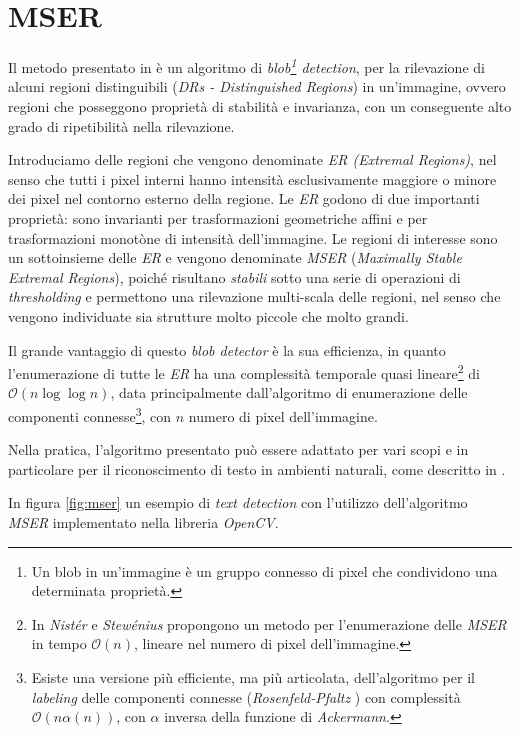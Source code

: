 \section{MSER}
Il metodo presentato in \cite{bib:mser} \`e un algoritmo di \textit{blob\footnote{Un blob in un'immagine \`e un gruppo connesso di pixel che condividono una determinata propriet\`a.} detection}, per la rilevazione di alcuni regioni distinguibili (\textit{DRs - Distinguished Regions}) in un'immagine, ovvero regioni che posseggono propriet\`a di stabilit\`a e invarianza, con un conseguente alto grado di ripetibilit\`a nella rilevazione.\par
Introduciamo delle regioni che vengono denominate \textit{ER (Extremal Regions)}, nel senso che tutti i pixel interni hanno intensit\`a esclusivamente maggiore o minore dei pixel nel contorno esterno della regione. Le \textit{ER} godono di due importanti propriet\`a: sono invarianti per trasformazioni geometriche affini e per trasformazioni monot\`one di intensit\`a dell'immagine. Le regioni di interesse sono un sottoinsieme delle \textit{ER} e vengono denominate \textit{MSER} (\textit{Maximally Stable Extremal Regions}), poich\'e risultano \textit{stabili} sotto una serie di operazioni di \textit{thresholding} e permettono una rilevazione multi-scala delle regioni, nel senso che vengono individuate sia strutture molto piccole che molto grandi.\par
Il grande vantaggio di questo \textit{blob detector} \`e la sua efficienza, in quanto l'enumerazione di tutte le \textit{ER} ha una complessit\`a temporale quasi lineare\footnote{In \cite{bib:mser-linear} \textit{Nist\'er} e \textit{Stew\'enius} propongono un metodo per l'enumerazione delle \textit{MSER} in tempo $\mathcal{O}(n)$, lineare nel numero di pixel dell'immagine.} di $\mathcal{O}(n\log{}\log{}n)$, data principalmente dall'algoritmo di enumerazione delle componenti connesse\footnote{Esiste una versione pi\`u efficiente, ma pi\`u articolata, dell'algoritmo per il \textit{labeling} delle componenti connesse (\textit{Rosenfeld-Pfaltz} \cite{bib:connected-components-fast}) con complessit\`a $\mathcal{O}(n\alpha(n))$, con $\alpha$ inversa della funzione di \textit{Ackermann}.}, con $n$ numero di pixel dell'immagine.\par
Nella pratica, l'algoritmo presentato pu\`o essere adattato per vari scopi e in particolare per il riconoscimento di testo in ambienti naturali, come descritto in \cite{bib:mser-canny}.\par
In figura \ref{fig:mser} un esempio di \textit{text detection} con l'utilizzo dell'algoritmo \textit{MSER} implementato nella libreria \textit{OpenCV}.
